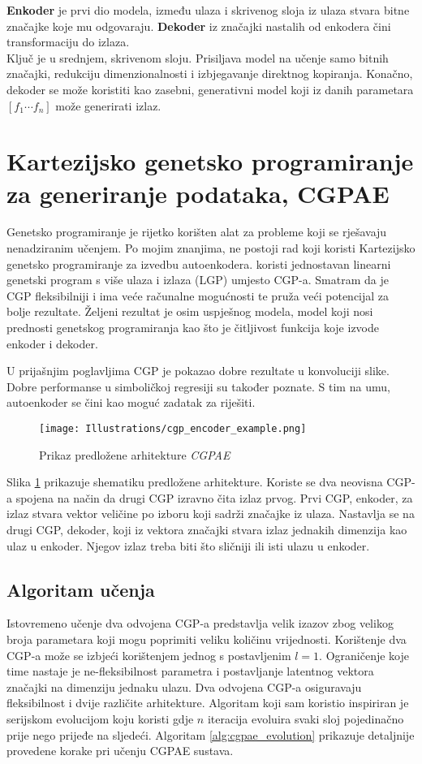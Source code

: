 \textbf{Enkoder} je prvi dio modela, između ulaza i skrivenog sloja iz ulaza stvara bitne značajke koje mu odgovaraju.
\textbf{Dekoder} iz značajki nastalih od enkodera čini transformaciju do izlaza. \\
Ključ je u srednjem, skrivenom sloju.
Prisiljava model na učenje samo bitnih značajki, redukciju dimenzionalnosti i izbjegavanje direktnog kopiranja.
Konačno, dekoder se može koristiti kao zasebni, generativni model koji iz danih parametara $[f_1 \cdots f_n]$ može generirati izlaz.

\section{Kartezijsko genetsko programiranje za generiranje podataka, CGPAE}
Genetsko programiranje je rijetko korišten alat za probleme koji se rješavaju nenadziranim učenjem.
Po mojim znanjima, ne postoji rad koji koristi Kartezijsko genetsko programiranje za izvedbu autoenkodera.
\cite{why_ae_diff} koristi jednostavan linearni genetski program s više ulaza i izlaza (LGP) umjesto CGP-a.
Smatram da je CGP fleksibilniji i ima veće računalne mogućnosti te pruža veći potencijal za bolje rezultate.
Željeni rezultat je osim uspješnog modela, model koji nosi prednosti genetskog programiranja kao što je čitljivost funkcija koje izvode enkoder i dekoder.

U prijašnjim poglavljima CGP je pokazao dobre rezultate u konvoluciji slike.
Dobre performanse u simboličkoj regresiji su također poznate.
S tim na umu, autoenkoder se čini kao moguć zadatak za riješiti.

\begin{figure}[H]
	\centering
	\texttt{[image: Illustrations/cgp\_encoder\_example.png]}
	\caption{Prikaz predložene arhitekture \emph{CGPAE}}
	\label{fig:cgpae}
\end{figure}

Slika \ref{fig:cgpae} prikazuje shematiku predložene arhitekture.
Koriste se dva neovisna CGP-a spojena na način da drugi CGP izravno čita izlaz prvog.
Prvi CGP, enkoder, za izlaz stvara vektor veličine po izboru koji sadrži značajke iz ulaza.
Nastavlja se na drugi CGP, dekoder, koji iz vektora značajki stvara izlaz jednakih dimenzija kao ulaz u enkoder.
Njegov izlaz treba biti što sličniji ili isti ulazu u enkoder.

\subsection{Algoritam učenja}
Istovremeno učenje dva odvojena CGP-a predstavlja velik izazov zbog velikog broja parametara koji mogu poprimiti veliku količinu vrijednosti.
Korištenje dva CGP-a može se izbjeći korištenjem jednog s postavljenim $l = 1$.
Ograničenje koje time nastaje je ne-fleksibilnost parametra i postavljanje latentnog vektora značajki na dimenziju jednaku ulazu.
Dva odvojena CGP-a osiguravaju fleksibilnost i dvije različite arhitekture.
Algoritam koji sam koristio inspiriran je serijskom evolucijom koju koristi \cite{conv_gen_programming} gdje $n$ iteracija evoluira svaki sloj pojedinačno prije nego prijeđe na sljedeći.
Algoritam \ref{alg:cgpae_evolution} prikazuje detaljnije provedene korake pri učenju CGPAE sustava.

